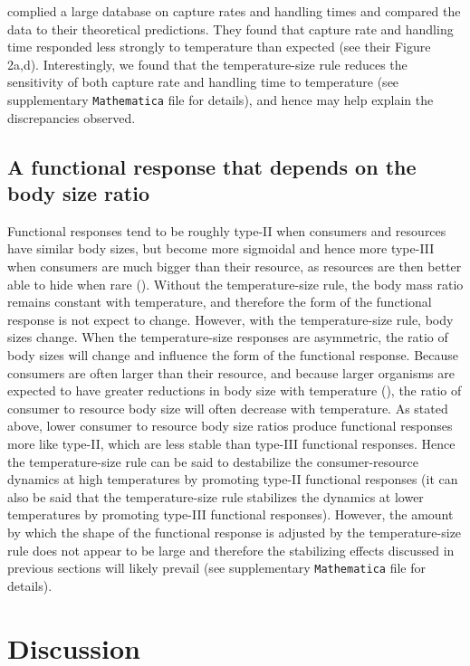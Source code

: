 \documentclass[11pt]{article}
\begin{document}
\cite{Rall2012} complied a large database on capture rates and handling times and compared the data to their theoretical predictions.
They found that capture rate and handling time responded less strongly to temperature than expected (see their Figure 2a,d).
Interestingly, we found that the temperature-size rule reduces the sensitivity of both capture rate and handling time to temperature (see supplementary \texttt{Mathematica} file for details), and hence may help explain the discrepancies observed. 

\subsection*{A functional response that depends on the body size ratio}

Functional responses tend to be roughly type-II when consumers and resources have similar body sizes, but become more sigmoidal and hence more type-III when consumers are much bigger than their resource, as resources are then better able to hide when rare (\cite{Kalinkat2013}).
Without the temperature-size rule, the body mass ratio remains constant with temperature, and therefore the form of the functional response is not expect to change.
However, with the temperature-size rule, body sizes change.
When the temperature-size responses are asymmetric, the ratio of body sizes will change and influence the form of the functional response.
Because consumers are often larger than their resource, and because larger organisms are expected to have greater reductions in body size with temperature (\cite{Forster2012}), the ratio of consumer to resource body size will often decrease with temperature.
As stated above, lower consumer to resource body size ratios produce functional responses more like type-II, which are less stable than type-III functional responses.
Hence the temperature-size rule can be said to destabilize the consumer-resource dynamics at high temperatures by promoting type-II functional responses (it can also be said that the temperature-size rule stabilizes the dynamics at lower temperatures by promoting type-III functional responses).
However, the amount by which the shape of the functional response is adjusted by the temperature-size rule does not appear to be large and therefore the stabilizing effects discussed in previous sections will likely prevail (see supplementary \texttt{Mathematica} file for details). 

\section*{Discussion}
\end{document}
